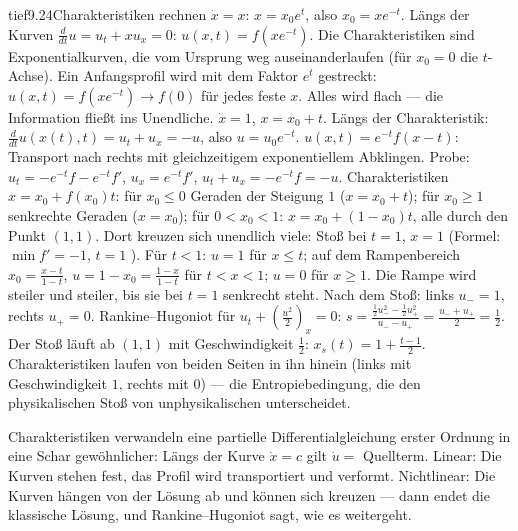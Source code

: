 \begin{loesungkarte}{tief}{9.24}{Charakteristiken rechnen}
$\dot x = x$: $x = x_0e^{t}$, also $x_0 = xe^{-t}$. Längs der Kurven $\frac{d}{dt}u = u_t + xu_x = 0$: $u(x, t) = f(xe^{-t})$. Die Charakteristiken sind Exponentialkurven, die vom Ursprung weg auseinanderlaufen (für $x_0 = 0$ die $t$-Achse). Ein Anfangsprofil wird mit dem Faktor $e^{t}$ gestreckt: $u(x, t) = f(xe^{-t})\to f(0)$ für jedes feste $x$. Alles wird flach --- die Information fließt ins Unendliche.
$\dot x = 1$, $x = x_0 + t$. Längs der Charakteristik: $\frac d{dt}u(x(t), t) = u_t + u_x = -u$, also $u = u_0e^{-t}$. $u(x, t) = e^{-t}f(x - t)$: Transport nach rechts mit gleichzeitigem exponentiellem Abklingen. Probe: $u_t = -e^{-t}f - e^{-t}f'$, $u_x = e^{-t}f'$, $u_t + u_x = -e^{-t}f = -u$. \checkmark
{}
Charakteristiken $x = x_0 + f(x_0)t$: für $x_0\le0$ Geraden der Steigung $1$ ($x = x_0 + t$); für $x_0\ge1$ senkrechte Geraden ($x = x_0$); für $0 < x_0 < 1$: $x = x_0 + (1 - x_0)t$, alle durch den Punkt $(1, 1)$. Dort kreuzen sich unendlich viele: Stoß bei $t = 1$, $x = 1$ (Formel: $\min f' = -1$, $t = 1$ \checkmark). Für $t < 1$: $u = 1$ für $x\le t$; auf dem Rampenbereich $x_0 = \frac{x - t}{1 - t}$, $u = 1 - x_0 = \frac{1 - x}{1 - t}$ für $t < x < 1$; $u = 0$ für $x\ge1$. Die Rampe wird steiler und steiler, bis sie bei $t = 1$ senkrecht steht.
Nach dem Stoß: links $u_- = 1$, rechts $u_+ = 0$. Rankine--Hugoniot für $u_t + (\frac{u^{2}}2)_x = 0$: $s = \frac{\frac12u_-^{2} - \frac12u_+^{2}}{u_- - u_+} = \frac{u_- + u_+}2 = \frac12$. Der Stoß läuft ab $(1, 1)$ mit Geschwindigkeit $\frac12$: $x_s(t) = 1 + \frac{t - 1}2$. Charakteristiken laufen von beiden Seiten in ihn hinein (links mit Geschwindigkeit $1$, rechts mit $0$) --- die Entropiebedingung, die den physikalischen Stoß von unphysikalischen unterscheidet.
\begin{mitnehmen}\kastentext
Charakteristiken verwandeln eine partielle Differentialgleichung erster Ordnung in eine Schar gewöhnlicher: Längs der Kurve $\dot x = c$ gilt $\dot u = $ Quellterm. Linear: Die Kurven stehen fest, das Profil wird transportiert und verformt. Nichtlinear: Die Kurven hängen von der Lösung ab und können sich kreuzen --- dann endet die klassische Lösung, und Rankine--Hugoniot sagt, wie es weitergeht.
\end{mitnehmen}
\end{loesungkarte}

